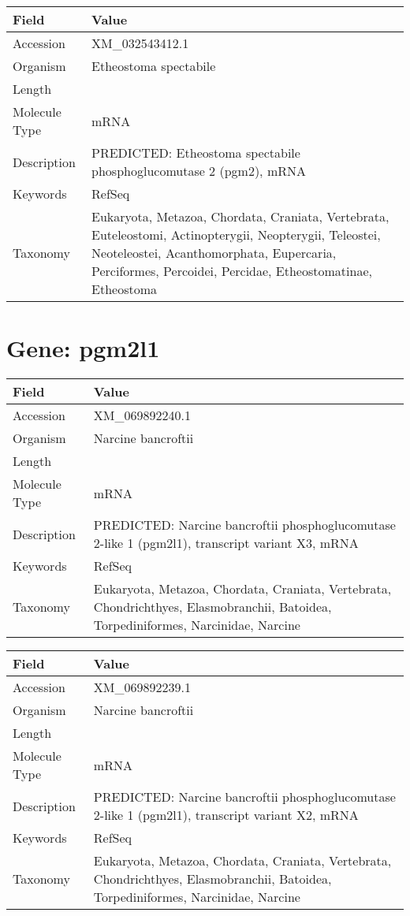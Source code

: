 \documentclass[10pt]{article}
\begin{document}
{\footnotesize
\begin{longtable}{>{\raggedright\arraybackslash}p{4.5cm} >{\raggedright\arraybackslash}p{11.5cm}}
\textbf{Field} & \textbf{Value} \\
\hline
Accession & XM\_032543412.1 \\
Organism & Etheostoma spectabile \\
Length & 2316 \\
Molecule Type & mRNA \\
Description & PREDICTED: Etheostoma spectabile phosphoglucomutase 2 (pgm2), mRNA \\
Keywords & RefSeq \\
Taxonomy & Eukaryota, Metazoa, Chordata, Craniata, Vertebrata, Euteleostomi, Actinopterygii, Neopterygii, Teleostei, Neoteleostei, Acanthomorphata, Eupercaria, Perciformes, Percoidei, Percidae, Etheostomatinae, Etheostoma \\
\end{longtable}
}


\section*{Gene: pgm2l1}
{\footnotesize
\begin{longtable}{>{\raggedright\arraybackslash}p{4.5cm} >{\raggedright\arraybackslash}p{11.5cm}}
\textbf{Field} & \textbf{Value} \\
\hline
Accession & XM\_069892240.1 \\
Organism & Narcine bancroftii \\
Length & 7060 \\
Molecule Type & mRNA \\
Description & PREDICTED: Narcine bancroftii phosphoglucomutase 2-like 1 (pgm2l1), transcript variant X3, mRNA \\
Keywords & RefSeq \\
Taxonomy & Eukaryota, Metazoa, Chordata, Craniata, Vertebrata, Chondrichthyes, Elasmobranchii, Batoidea, Torpediniformes, Narcinidae, Narcine \\
\end{longtable}
}

{\footnotesize
\begin{longtable}{>{\raggedright\arraybackslash}p{4.5cm} >{\raggedright\arraybackslash}p{11.5cm}}
\textbf{Field} & \textbf{Value} \\
\hline
Accession & XM\_069892239.1 \\
Organism & Narcine bancroftii \\
Length & 7228 \\
Molecule Type & mRNA \\
Description & PREDICTED: Narcine bancroftii phosphoglucomutase 2-like 1 (pgm2l1), transcript variant X2, mRNA \\
Keywords & RefSeq \\
Taxonomy & Eukaryota, Metazoa, Chordata, Craniata, Vertebrata, Chondrichthyes, Elasmobranchii, Batoidea, Torpediniformes, Narcinidae, Narcine \\
\end{longtable}
}
\end{document}
